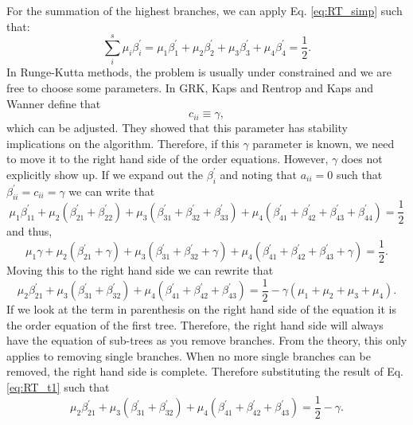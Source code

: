 \documentclass{ansconf}
\numberwithin{equation}{section}
\begin{document}
For the summation of the highest branches, we can apply Eq. \eqref{eq:RT_simp} such that:
\begin{equation}
    \sum_i^s \mu_i\beta^\prime_i = \mu_1\beta^\prime_1 + \mu_2\beta^\prime_2 + \mu_3\beta^\prime_3 + \mu_4\beta^\prime_4 = \frac{1}{2}. 
\end{equation}
In Runge-Kutta methods, the problem is usually under constrained and we are free to choose some parameters. In GRK, Kaps and Rentrop and Kaps and Wanner define that
\begin{equation}
    c_{ii} \equiv \gamma ,
\end{equation}
which can be adjusted. They showed that this parameter has stability implications on the algorithm. Therefore, if this $\gamma$ parameter is known, we need to move it to the right hand side of the order equations. However, $\gamma$ does not explicitly show up. If we expand out the $\beta^\prime_i$ and noting that $a_{ii} = 0$ such that $\beta^\prime_{ii} = c_{ii} = \gamma$ we can write that
\begin{equation}
    \mu_1\beta^\prime_{11} + \mu_2\left(\beta^\prime_{21} + \beta^\prime_{22}\right) + \mu_3\left(\beta^\prime_{31} + \beta^\prime_{32} +\beta^\prime_{33} \right) + \mu_4\left(\beta^\prime_{41} + \beta^\prime_{42}+ \beta^\prime_{43} + \beta^\prime_{44}\right) = \frac{1}{2}
\end{equation}
and thus,
\begin{equation}
    \mu_1\gamma + \mu_2\left(\beta^\prime_{21} + \gamma\right) + \mu_3\left(\beta^\prime_{31} + \beta^\prime_{32} +\gamma \right) + \mu_4\left(\beta^\prime_{41} + \beta^\prime_{42}+ \beta^\prime_{43} + \gamma \right) = \frac{1}{2}.
\end{equation}
Moving this to the right hand side we can rewrite that
\begin{equation}
    \mu_2\beta^\prime_{21} + \mu_3\left(\beta^\prime_{31} + \beta^\prime_{32} \right) + \mu_4\left(\beta^\prime_{41} + \beta^\prime_{42}+ \beta^\prime_{43} \right) = \frac{1}{2} - \gamma\left(\mu_1 + \mu_2 + \mu_3 + \mu_4\right).
\end{equation}
If we look at the term in parenthesis on the right hand side of the equation it is the order equation of the first tree. Therefore, the right hand side will always have the equation of sub-trees as you remove branches. From the theory, this only applies to removing single branches. When no more single branches can be removed, the right hand side is complete. Therefore substituting the result of Eq. \eqref{eq:RT_t1} such that
\begin{equation}
    \mu_2\beta^\prime_{21} + \mu_3\left(\beta^\prime_{31} + \beta^\prime_{32} \right) + \mu_4\left(\beta^\prime_{41} + \beta^\prime_{42}+ \beta^\prime_{43} \right) = \frac{1}{2} - \gamma.
\end{equation}
\end{document}
